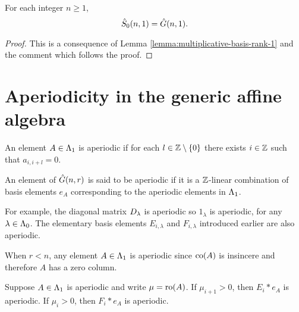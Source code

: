 \documentclass[a4paper, 11pt]{report}
\begin{document}
\begin{corollary}\label{lemma:generic-zero-schur-same-in-rank-1}
For each integer $n\geq 1$,
\begin{equation*}
\zeroschur[n,1] = \generic[n,1].
\end{equation*}
\end{corollary}

\begin{proof}
This is a consequence of Lemma \ref{lemma:multiplicative-basis-rank-1} and the comment which follows the proof.
\end{proof}


\section{Aperiodicity in the generic affine algebra}


\begin{definition}\label{def:aperiodic}
An element $A\in\matrices$ is aperiodic if for each $l\in\integers\setminus\{0\}$ there exists $i\in\integers$ such that $a_{i,i+l}=0$.
\end{definition}

An element of $\generic$ is said to be aperiodic if it is a $\integers$-linear combination of basis elements $e_A$ corresponding to the aperiodic elements in $\matrices$.

For example, the diagonal matrix $\diag{\lambda}$ is aperiodic so $1_\lambda$ is aperiodic, for any $\lambda\in\compositions$. The elementary basis elements $E_{i,\lambda}$ and $F_{i,\lambda}$ introduced earlier are also aperiodic.

When $r<n$, any element $A\in\matrices$ is aperiodic since $\co{A}$ is insincere and therefore $A$ has a zero column.

\begin{lemma}\label{lemma:words-are-aperiodic}
Suppose $A\in\matrices$ is aperiodic and write $\mu=\ro{A}$. If $\mu_{i+1}>0$, then $E_i\ast e_A$ is aperiodic. If $\mu_i>0$, then $F_i\ast e_A$ is aperiodic.
\end{lemma}
\end{document}
